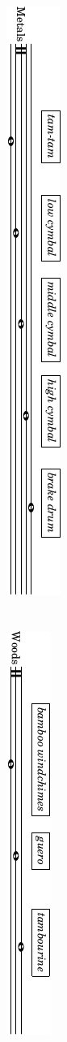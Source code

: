 \documentclass[11pt]{article}
\begin{document}
\begin{textblock}{11}
\begin{itemize}
        \includegraphics{../assets/preface-percussion-metals.pdf} \\ \\ \\
        \includegraphics{../assets/preface-percussion-woods.pdf} \\ \\ \\

\end{itemize}
\end{textblock}
\end{document}
